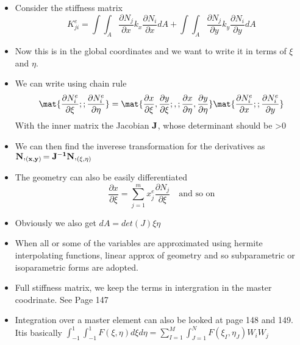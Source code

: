 	\begin{frame}
		\begin{itemize}
			\item Consider the stiffness matrix 
			\begin{equation}
				K^e_{ji} =  \int\int _A \frac{\partial N_j}{\partial x} k_x \frac{\partial  N_i }{\partial x} dA +
				\int\int _A \frac{\partial N_j}{\partial y} k_y \frac{\partial N_i }{\partial y} dA
			\end{equation}
			\item Now this is in the global coordinates and we want to write it in terms of $\xi$ and $\eta$. 
			\item We can write using chain rule 
			\begin{equation}
				\mat{\frac{\partial N_i^e}{\partial \xi }; ;\frac{\partial N_i^e}{\partial \eta}} = \mat{\frac{\partial x}{\partial \xi},\frac{\partial y}{\partial \xi}; , ;\frac{\partial x}{\partial \eta},\frac{\partial y}{\partial \eta}}
				\mat{\frac{\partial N_i^e}{\partial x }; ;\frac{\partial N_i^e}{\partial y}}
			\end{equation}
			With the inner matrix the Jacobian $\mathbf{J}$, whose determinant should be >0
			\item We can then find the inverese transformation for the derivatives as $\mathbf{ N,_{(x,y)} = J^{-1}N,_{(\xi,\eta)}}$
			\item The geometry can also be easily differentiated
			\begin{equation}
			 \frac{\partial x}{\partial \xi} = \sum_{j=1}^{m} x_j^e \frac{\partial N_j}{\partial \xi} \quad \text{and so on}
			\end{equation}
		\end{itemize}
	\end{frame}



	\begin{frame}
		\begin{itemize}
			\item Obviously we also get $dA = det(J)\xi\eta$
			\item When all or some of the variables are approximated using hermite interpolating functions, linear approx of geometry and so subparametric or isoparametric forms are adopted.
			\item  Full stiffness matrix, we keep the terms in intergration in the master coodrinate. See Page 147
			\item Integration over a master element can also be looked at page 148 and 149. Itis basically $\int_{-1}^{1}\int_{-1}^{1} F(\xi,\eta) d\xi d\eta = \sum_{I=1}^{M} \int_{J=1}^{N} F(\xi_I,\eta_J) W_i W_j$
		\end{itemize}
	\end{frame}



